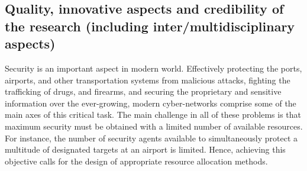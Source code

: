 
\subsection{Quality, innovative aspects and credibility of the research (including inter/multidisciplinary aspects)}
\label{sec:quality}


Security is an important aspect in modern world.
Effectively protecting the ports, airports, and other transportation systems from malicious attacks,
fighting the trafficking of drugs, and firearms, and securing the proprietary and sensitive information over the ever-growing, modern cyber-networks comprise some of the main axes of this critical task. The main challenge in all of these problems is that maximum security must be obtained with a limited number of available resources. For instance, the number of security agents available to simultaneously protect a multitude of designated targets at an airport is limited. Hence, achieving this objective calls for the design of appropriate resource allocation methods. 


